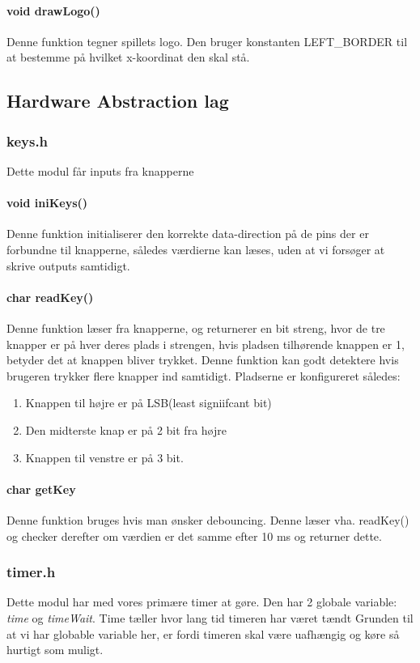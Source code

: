 \paragraph{void drawLogo()}
Denne funktion tegner spillets logo. Den bruger konstanten LEFT\_BORDER til at bestemme på hvilket x-koordinat den skal stå. 

\subsection{Hardware Abstraction lag}
\subsubsection{keys.h}
Dette modul får inputs fra knapperne 
\paragraph{void iniKeys()}
Denne funktion initialiserer den korrekte data-direction på de pins der er forbundne til knapperne, således værdierne kan læses, uden at vi forsøger at skrive outputs samtidigt.

\paragraph{char readKey()}
Denne funktion læser fra knapperne, og returnerer en bit streng, hvor de tre knapper er på hver deres plads i strengen, hvis pladsen tilhørende knappen er 1, betyder det at knappen bliver trykket. Denne funktion kan godt detektere hvis brugeren trykker flere knapper ind samtidigt. Pladserne er konfigureret således:
\begin{enumerate}
\item Knappen til højre er på LSB(least signiifcant bit)
\item Den midterste knap er på 2 bit fra højre
\item Knappen til venstre er på 3 bit.
\end{enumerate}

\paragraph{char getKey}
Denne funktion bruges hvis man ønsker debouncing. Denne læser vha. readKey() og checker derefter om værdien er det samme efter 10 ms og returner dette.
\subsubsection{timer.h}
Dette modul har med vores primære timer at gøre. Den har 2 globale variable: \textit{time} og \textit{timeWait}. Time tæller hvor lang tid timeren har været tændt Grunden til at vi har globable variable her, er fordi timeren skal være uafhængig og køre så hurtigt som muligt.
